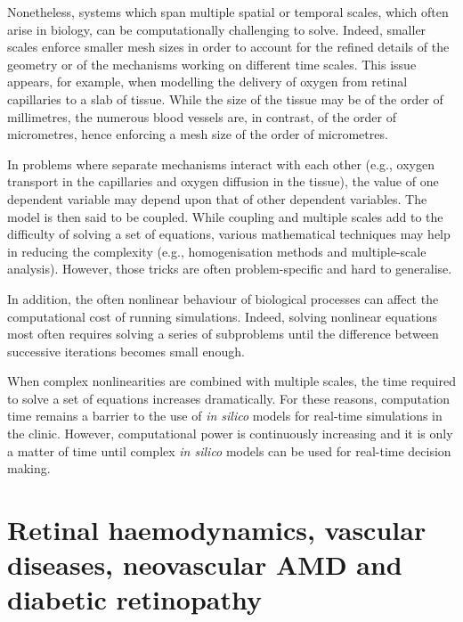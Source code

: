 \documentclass{article}
\begin{document}
Nonetheless, systems which span multiple spatial or temporal scales, which often arise in biology, can be computationally challenging to solve.
Indeed, smaller scales enforce smaller mesh sizes in order to account for the refined details of the geometry or of the mechanisms working on different time scales.
This issue appears, for example, when modelling the delivery of oxygen from retinal capillaries to a slab of tissue.
While the size of the tissue may be of the order of millimetres, the numerous blood vessels are, in contrast, of the order of micrometres, hence enforcing a mesh size of the order of micrometres.

In problems where separate mechanisms interact with each other (e.g., oxygen transport in the capillaries and oxygen diffusion in the tissue), the value of one dependent variable may depend upon that of other dependent variables.
The model is then said to be coupled.
While coupling and multiple scales add to the difficulty of solving a set of equations, various mathematical techniques may help in reducing the complexity (e.g., homogenisation methods and multiple-scale analysis).
However, those tricks are often problem-specific and hard to generalise.

In addition, the often nonlinear behaviour of biological processes can affect the computational cost of running simulations.
Indeed, solving nonlinear equations most often requires solving a series of subproblems until the difference between successive iterations becomes small enough.

When complex nonlinearities are combined with multiple scales, the time required to solve a set of equations increases dramatically.
For these reasons, computation time remains a barrier to the use of \textit{in silico} models for real-time simulations in the clinic.
However, computational power is continuously increasing and it is only a matter of time until complex \textit{in silico} models can be used for real-time decision making.





\section{Retinal haemodynamics, vascular diseases, neovascular AMD and diabetic retinopathy}\label{sec:RetinalHaemodynamicsNAMDDR}
\end{document}
